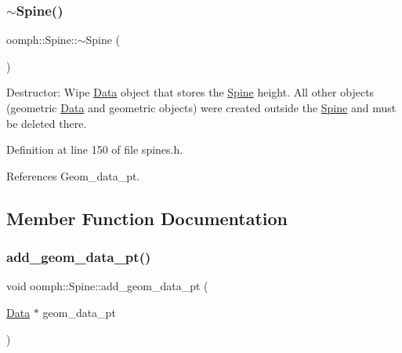 \mbox{\label{classoomph_1_1Spine_a0612b3e02900f28a6c922a76aacfe4cd}} 
\subsubsection{\texorpdfstring{$\sim$\+Spine()}{~Spine()}}
{\footnotesize\ttfamily oomph\+::\+Spine\+::$\sim$\+Spine (\begin{DoxyParamCaption}{ }\end{DoxyParamCaption})\hspace{0.3cm}{\ttfamily [inline]}}



Destructor\+: Wipe \hyperlink{classoomph_1_1Data}{Data} object that stores the \hyperlink{classoomph_1_1Spine}{Spine} height. All other objects (geometric \hyperlink{classoomph_1_1Data}{Data} and geometric objects) were created outside the \hyperlink{classoomph_1_1Spine}{Spine} and must be deleted there. 



Definition at line 150 of file spines.\+h.



References Geom\+\_\+data\+\_\+pt.



\subsection{Member Function Documentation}
\mbox{\label{classoomph_1_1Spine_a2d376df8ef9da2c04f2e27cb68496840}} 
\subsubsection{\texorpdfstring{add\+\_\+geom\+\_\+data\+\_\+pt()}{add\_geom\_data\_pt()}}
{\footnotesize\ttfamily void oomph\+::\+Spine\+::add\+\_\+geom\+\_\+data\+\_\+pt (\begin{DoxyParamCaption}\item[{\hyperlink{classoomph_1_1Data}{Data} $\ast$}]{geom\+\_\+data\+\_\+pt }\end{DoxyParamCaption})\hspace{0.3cm}{\ttfamily [inline]}}



